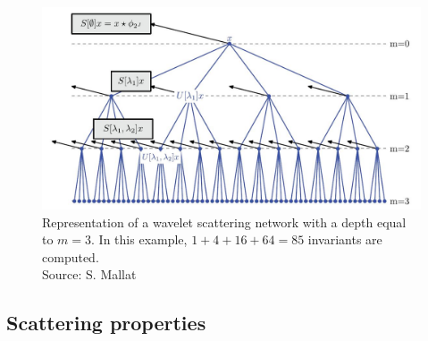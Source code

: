 \documentclass[10pt]{beamer}
\begin{document}
\begin{darkframes}
    \begin{frame}[label=build]{\subsecname}
    \begin{figure}
        \centering
        \includegraphics[width=\textwidth]{resources/convolution/Scattering_net.JPG}
        \caption{Representation of a wavelet scattering network with a depth equal to $m=3$. In this example, $1+4+16+64=85$ invariants are computed.\\Source: S. Mallat}
    \end{figure}
    \end{frame}
    
    \subsection{Scattering properties}
    
    \begin{frame}[label=scat_prop]{\subsecname}
    \end{frame}

  \end{darkframes}
\end{document}
